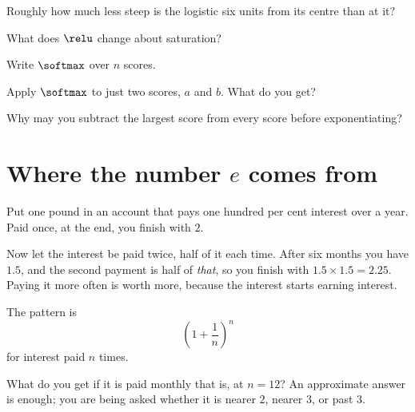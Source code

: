 \begin{quiz}
\item Roughly how much less steep is the logistic six units from its centre
  than at it? 
\item What does $\relu$ change about saturation? 
\item Write $\softmax$ over $n$ scores. 
\item Apply $\softmax$ to just two scores, $a$ and $b$. What do you get?
\item Why may you subtract the largest score from every score before
  exponentiating? 
\end{quiz}

\section{Where the number \texorpdfstring{$e$}{e} comes from}
\label{sec:F07-e}

\begin{fr}
Put one pound in an account that pays one hundred per cent interest over a
year. Paid once, at the end, you finish with $2$.

Now let the interest be paid twice, half of it each time. After six months you
have $\num{1.5}$, and the second payment is half of \emph{that}, so you finish
with $\num{1.5} \times \num{1.5} = \num{2.25}$. Paying it more often is worth
more, because the interest starts earning interest.

The pattern is
\[ \left(1 + \frac{1}{n}\right)^{n} \]
for interest paid $n$ times.

What do you get if it is paid monthly \dash{} that is, at $n = 12$? An
approximate answer is enough; you are being asked whether it is nearer $2$,
nearer $3$, or past $3$.
\nextframe
\end{fr}

